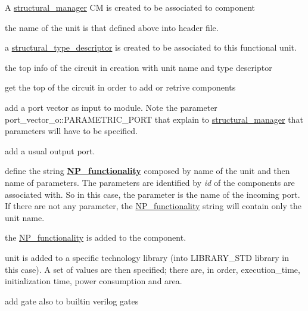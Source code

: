 \begin{DoxyEnumerate}
\item A \hyperlink{classstructural__manager}{structural\+\_\+manager} CM is created to be associated to component
\item the name of the unit is that defined above into header file.
\item a \hyperlink{structstructural__type__descriptor}{structural\+\_\+type\+\_\+descriptor} is created to be associated to this functional unit.
\item the top info of the circuit in creation with unit name and type descriptor
\item get the top of the circuit in order to add or retrive components
\item add a port vector as input to module. Note the parameter port\+\_\+vector\+\_\+o\+::\+P\+A\+R\+A\+M\+E\+T\+R\+I\+C\+\_\+\+P\+O\+RT that explain to \hyperlink{classstructural__manager}{structural\+\_\+manager} that parameters will have to be specified.
\item add a usual output port.
\item define the string {\bfseries \hyperlink{classNP__functionality}{N\+P\+\_\+functionality}} composed by name of the unit and then name of parameters. The parameters are identified by {\itshape id} of the components are associated with. So in this case, the parameter is the name of the incoming port. If there are not any parameter, the \hyperlink{classNP__functionality}{N\+P\+\_\+functionality} string will contain only the unit name.
\item the \hyperlink{classNP__functionality}{N\+P\+\_\+functionality} is added to the component.
\item unit is added to a specific technology library (into L\+I\+B\+R\+A\+R\+Y\+\_\+\+S\+TD library in this case). A set of values are then specified; there are, in order, execution\+\_\+time, initialization time, power consumption and area.
\item add gate also to builtin verilog gates
\end{DoxyEnumerate}


